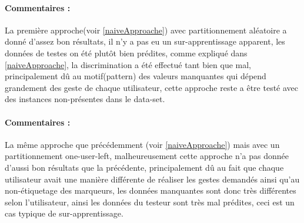 \paragraph{Commentaires :}
La première approche(voir \ref{naiveApproache}) avec partitionnement aléatoire a  donné d'assez bon résultats, il n'y a pas eu un sur-apprentissage apparent, les données de testes on été plutôt bien prédites, comme expliqué dans \ref{naiveApproache}, la discrimination a été effectué tant bien que mal, principalement dû au motif(pattern) des valeurs manquantes qui dépend grandement des geste de chaque utilisateur, cette approche reste a être testé avec des instances non-présentes dans le data-set.
\begin{table}[H]
	\centering
	\label{shit}
	\caption{Meilleures architectures sur les données de teste pour l'approche avec naïve (\ref{naiveApproache}) avec partitionnement one-user-left(\ref{oneLeftLearning})}
\end{table}

\paragraph{Commentaires :	}
La même approche que précédemment (voir \ref{naiveApproache}) mais avec un partitionnement one-user-left, malheureusement cette approche n'a pas donnée d'aussi bon résultats que la précédente, principalement dû au fait que chaque utilisateur avait une manière différente de réaliser les gestes demandés ainsi qu'au non-étiquetage des marqueurs, les données manquantes sont donc très différentes selon l'utilisateur, ainsi les données du testeur sont très mal prédites, ceci est un cas typique de sur-apprentissage.

